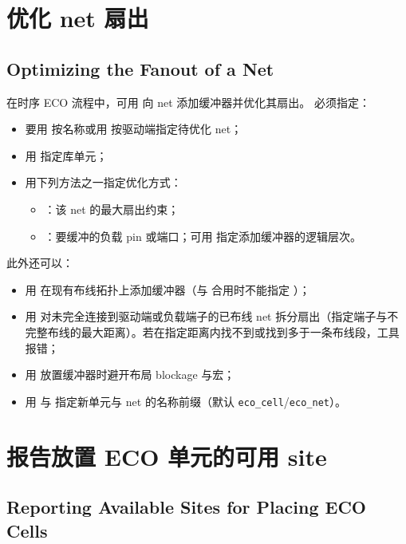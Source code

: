 \section{优化 net 扇出}
\subsection*{Optimizing the Fanout of a Net}

在时序 ECO 流程中，可用  向 net 添加缓冲器并优化其扇出。
必须指定：
\begin{itemize}
  \item 要用  按名称或用  按驱动端指定待优化 net；
  \item 用  指定库单元；
  \item 用下列方法之一指定优化方式：
  \begin{itemize}
    \item {}：该 net 的最大扇出约束；
    \item {}：要缓冲的负载 pin 或端口；可用  指定添加缓冲器的逻辑层次。
  \end{itemize}
\end{itemize}

此外还可以：
\begin{itemize}
  \item 用  在现有布线拓扑上添加缓冲器（与  合用时不能指定 ）；
  \item 用  对未完全连接到驱动端或负载端子的已布线 net 拆分扇出（指定端子与不完整布线的最大距离）。若在指定距离内找不到或找到多于一条布线段，工具报错；
  \item 用  放置缓冲器时避开布局 blockage 与宏；
  \item 用  与  指定新单元与 net 的名称前缀（默认 \texttt{eco\_cell}/\texttt{eco\_net}）。
\end{itemize}

\section{报告放置 ECO 单元的可用 site}
\subsection*{Reporting Available Sites for Placing ECO Cells}

